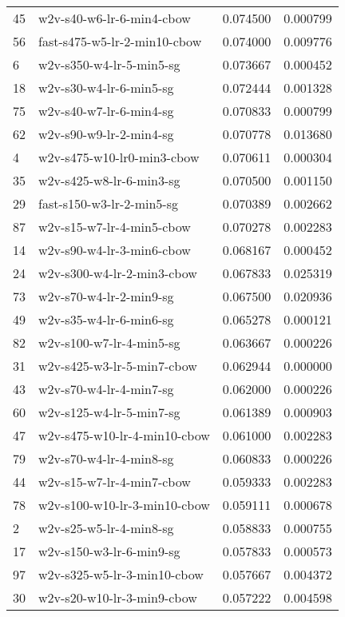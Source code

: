 {\begin{tabular}{llrr}
45 &     w2v-s40-w6-lr-6-min4-cbow &  0.074500 &  0.000799 \\
56 &  fast-s475-w5-lr-2-min10-cbow &  0.074000 &  0.009776 \\
6  &      w2v-s350-w4-lr-5-min5-sg &  0.073667 &  0.000452 \\
18 &       w2v-s30-w4-lr-6-min5-sg &  0.072444 &  0.001328 \\
75 &       w2v-s40-w7-lr-6-min4-sg &  0.070833 &  0.000799 \\
62 &       w2v-s90-w9-lr-2-min4-sg &  0.070778 &  0.013680 \\
4  &    w2v-s475-w10-lr0-min3-cbow &  0.070611 &  0.000304 \\
35 &      w2v-s425-w8-lr-6-min3-sg &  0.070500 &  0.001150 \\
29 &     fast-s150-w3-lr-2-min5-sg &  0.070389 &  0.002662 \\
87 &     w2v-s15-w7-lr-4-min5-cbow &  0.070278 &  0.002283 \\
14 &     w2v-s90-w4-lr-3-min6-cbow &  0.068167 &  0.000452 \\
24 &    w2v-s300-w4-lr-2-min3-cbow &  0.067833 &  0.025319 \\
73 &       w2v-s70-w4-lr-2-min9-sg &  0.067500 &  0.020936 \\
49 &       w2v-s35-w4-lr-6-min6-sg &  0.065278 &  0.000121 \\
82 &      w2v-s100-w7-lr-4-min5-sg &  0.063667 &  0.000226 \\
31 &    w2v-s425-w3-lr-5-min7-cbow &  0.062944 &  0.000000 \\
43 &       w2v-s70-w4-lr-4-min7-sg &  0.062000 &  0.000226 \\
60 &      w2v-s125-w4-lr-5-min7-sg &  0.061389 &  0.000903 \\
47 &  w2v-s475-w10-lr-4-min10-cbow &  0.061000 &  0.002283 \\
79 &       w2v-s70-w4-lr-4-min8-sg &  0.060833 &  0.000226 \\
44 &     w2v-s15-w7-lr-4-min7-cbow &  0.059333 &  0.002283 \\
78 &  w2v-s100-w10-lr-3-min10-cbow &  0.059111 &  0.000678 \\
2  &       w2v-s25-w5-lr-4-min8-sg &  0.058833 &  0.000755 \\
17 &      w2v-s150-w3-lr-6-min9-sg &  0.057833 &  0.000573 \\
97 &   w2v-s325-w5-lr-3-min10-cbow &  0.057667 &  0.004372 \\
30 &    w2v-s20-w10-lr-3-min9-cbow &  0.057222 &  0.004598 \\

\end{tabular}}
